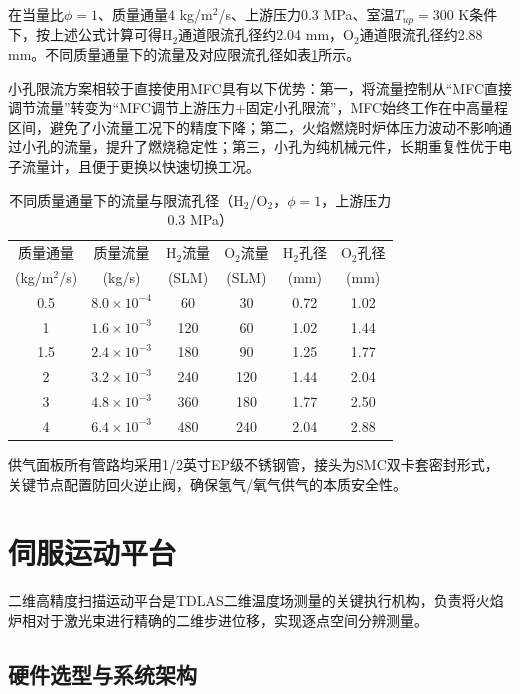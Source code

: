 在当量比$\phi=1$、质量通量4 kg/m$^2$/s、上游压力0.3 MPa、室温$T_{up}=300$ K条件下，按上述公式计算可得H$_2$通道限流孔径约2.04 mm，O$_2$通道限流孔径约2.88 mm。不同质量通量下的流量及对应限流孔径如表\ref{tab:flow_orifice}所示。

小孔限流方案相较于直接使用MFC具有以下优势：第一，将流量控制从“MFC直接调节流量”转变为“MFC调节上游压力+固定小孔限流”，MFC始终工作在中高量程区间，避免了小流量工况下的精度下降；第二，火焰燃烧时炉体压力波动不影响通过小孔的流量，提升了燃烧稳定性；第三，小孔为纯机械元件，长期重复性优于电子流量计，且便于更换以快速切换工况。

\begin{table}[H]
	\centering
	\caption{不同质量通量下的流量与限流孔径（H$_2$/O$_2$，$\phi=1$，上游压力0.3 MPa）}
	\label{tab:flow_orifice}
	\begin{tabular}{cccccc}
		\toprule
		质量通量 & 质量流量 & H$_2$流量 & O$_2$流量 & H$_2$孔径 & O$_2$孔径 \\
		(kg/m$^2$/s) & (kg/s) & (SLM) & (SLM) & (mm) & (mm) \\
		\midrule
		0.5 & $8.0\times10^{-4}$ & 60 & 30 & 0.72 & 1.02 \\
		1 & $1.6\times10^{-3}$ & 120 & 60 & 1.02 & 1.44 \\
		1.5 & $2.4\times10^{-3}$ & 180 & 90 & 1.25 & 1.77 \\
		2 & $3.2\times10^{-3}$ & 240 & 120 & 1.44 & 2.04 \\
		3 & $4.8\times10^{-3}$ & 360 & 180 & 1.77 & 2.50 \\
		4 & $6.4\times10^{-3}$ & 480 & 240 & 2.04 & 2.88 \\
		\bottomrule
	\end{tabular}
\end{table}

供气面板所有管路均采用1/2英寸EP级不锈钢管，接头为SMC双卡套密封形式，关键节点配置防回火逆止阀，确保氢气/氧气供气的本质安全性。


\section{伺服运动平台}

二维高精度扫描运动平台是TDLAS二维温度场测量的关键执行机构，负责将火焰炉相对于激光束进行精确的二维步进位移，实现逐点空间分辨测量。

\subsection{硬件选型与系统架构}

